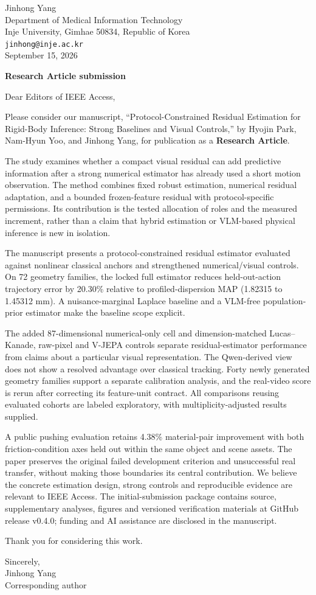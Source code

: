 \documentclass[11pt]{article}
\begin{document}
\begin{flushright}
Jinhong Yang\\
Department of Medical Information Technology\\
Inje University, Gimhae 50834, Republic of Korea\\
\texttt{jinhong@inje.ac.kr}\\
September 15, 2026
\end{flushright}
\textbf{Research Article submission}\par
Dear Editors of IEEE Access,

Please consider our manuscript, ``Protocol-Constrained Residual Estimation for Rigid-Body Inference: Strong Baselines and Visual Controls,'' by Hyojin Park, Nam-Hyun Yoo, and Jinhong Yang, for publication as a \textbf{Research Article}.

The study examines whether a compact visual residual can add predictive information after a strong numerical estimator has already used a short motion observation. The method combines fixed robust estimation, numerical residual adaptation, and a bounded frozen-feature residual with protocol-specific permissions. Its contribution is the tested allocation of roles and the measured increment, rather than a claim that hybrid estimation or VLM-based physical inference is new in isolation.

The manuscript presents a protocol-constrained residual estimator evaluated against nonlinear classical anchors and strengthened numerical/visual controls. On 72 geometry families, the locked full estimator reduces held-out-action trajectory error by 20.30\% relative to profiled-dispersion MAP (1.82315 to 1.45312 mm). A nuisance-marginal Laplace baseline and a VLM-free population-prior estimator make the baseline scope explicit.

The added 87-dimensional numerical-only cell and dimension-matched Lucas--Kanade, raw-pixel and V-JEPA controls separate residual-estimator performance from claims about a particular visual representation. The Qwen-derived view does not show a resolved advantage over classical tracking. Forty newly generated geometry families support a separate calibration analysis, and the real-video score is rerun after correcting its feature-unit contract. All comparisons reusing evaluated cohorts are labeled exploratory, with multiplicity-adjusted results supplied.

A public pushing evaluation retains 4.38\% material-pair improvement with both friction-condition axes held out within the same object and scene assets. The paper preserves the original failed development criterion and unsuccessful real transfer, without making those boundaries its central contribution. We believe the concrete estimation design, strong controls and reproducible evidence are relevant to IEEE Access. The initial-submission package contains source, supplementary analyses, figures and versioned verification materials at GitHub release v0.4.0; funding and AI assistance are disclosed in the manuscript.

Thank you for considering this work.

Sincerely,\\
Jinhong Yang\\
Corresponding author
\end{document}

